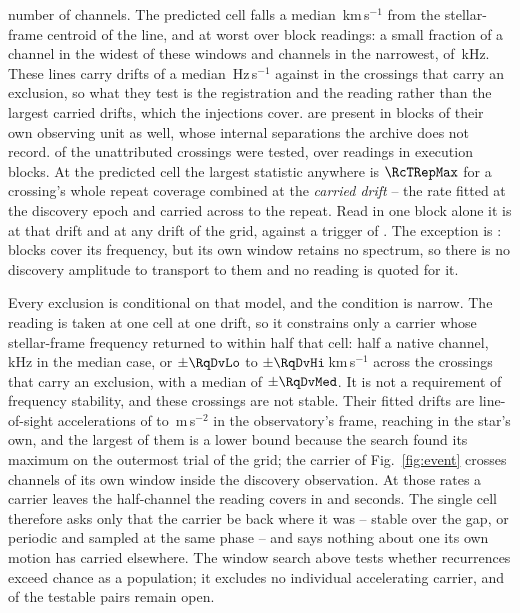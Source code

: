 number of channels. The predicted cell falls a median
\RgCenMedKms\,km\,s$^{-1}$ from the stellar-frame centroid of the line, and
\RgCenMaxKms{} at worst over \RgCenNBlock{} block readings: a small fraction
of a channel in the widest of these windows and \RgOffMaxCh{} channels in
the narrowest, of \RgOffMaxChanKHz\,kHz. These lines
carry drifts of a median \LrDriftMedLine\,Hz\,s$^{-1}$ against
\LrDriftMedExcl{} in the crossings that carry an exclusion, so what they test
is the registration and the reading rather than the largest carried drifts,
which the injections cover. \QcNUnrecWord{} are present
in blocks of their own observing unit as well, whose internal separations the
archive does not record. \RcNExclPoss{} of the \RcNTested{} unattributed crossings were tested,
over \RcNRepeatMeas{} readings in \RcNRepeatBlock{} execution blocks. At the
predicted cell the largest statistic anywhere is $\RcTRepMax$ for a crossing's
whole repeat coverage combined at the \emph{carried drift} -- the rate fitted
at the discovery epoch and carried across to the repeat. Read in one block
alone it is \RcTMatched{} at that drift and \RcTMax{} at any drift of the
grid, against a trigger of \StageNullTrig. The exception is \RcUntStar{} \texttt{\RcUntEb}:
\RcUntNRep{} blocks cover its frequency, but its own window retains no
spectrum, so there is no discovery amplitude to transport to them and no
reading is quoted for it.

Every exclusion is conditional on that model, and the condition is narrow. The reading is taken at one cell at one drift, so it constrains only a
carrier whose stellar-frame frequency returned to within half that cell:
half a native channel, \RqHalfChanKHz\,kHz in the median case, or
$\pm\RqDvLo$ to $\pm\RqDvHi$\,km\,s$^{-1}$ across the \RcNExcl{}
crossings that carry an exclusion, with a median of $\pm\RqDvMed$. It is not a requirement of frequency stability, and these crossings are
not stable. Their fitted drifts are line-of-sight accelerations of
\ZtALosLo{} to \ZtALosHi\,m\,s$^{-2}$ in the observatory's frame, reaching
\EgStarALosHi{} in the star's own, and the largest of them is a lower bound
because the search found its maximum on the outermost trial of the grid; the
carrier of
Fig.~\ref{fig:event} crosses \EvADriftChan{} channels of its own window
inside the discovery observation. At those rates a carrier leaves the
half-channel the reading covers in \ZtSxLeaveSec{} and \ZtCpLeaveSec{}
seconds. The single cell therefore asks
only that the carrier be back where it was -- stable over the gap, or
periodic and sampled at the same phase -- and says nothing about one its own
motion has carried elsewhere. The window search above tests whether
recurrences exceed chance as a population; it excludes no individual
accelerating carrier, and \TjNOpen{} of the \TjNPair{} testable pairs remain
open.

